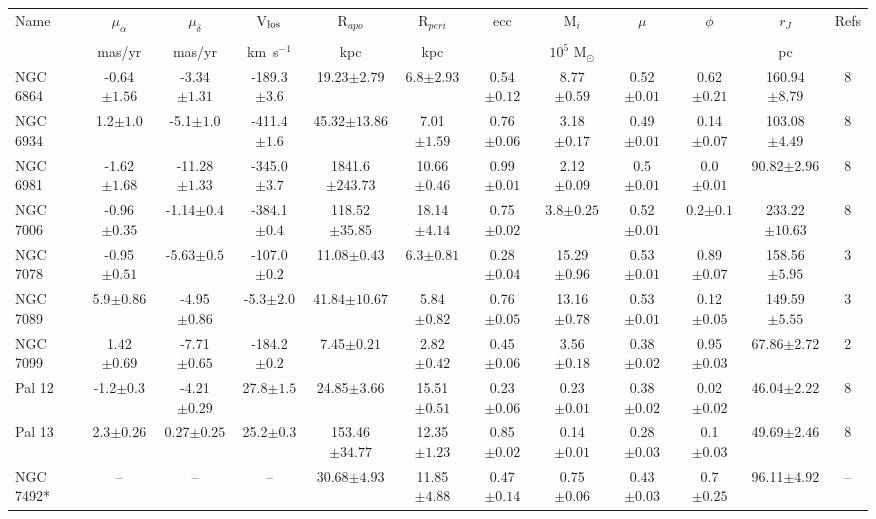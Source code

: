 \begin{landscape}
\begin{table}
\footnotesize
\begin{tabular}{lccccccccccc}
\hline
Name & $\mu_{\alpha}$ & $\mu_{\delta}$ & V$_{\rm los}$ & R$_{apo}$ & R$_{peri}$ & ecc & M$_{i}$ & $\mu$ & $\phi$ & $r_J$ & Refs \\\\
 & mas/yr & mas/yr & km$\,$ s$^{-1}$ & kpc & kpc & & $10^5$ M$_{\odot}$ & & & pc & \\
\hline
\hline
NGC 6864 & -0.64$\pm{1.56}$ & -3.34$\pm{1.31}$ & -189.3$\pm{3.6}$ & 19.23$\pm{2.79}$ & 6.8$\pm{2.93}$ & 0.54$\pm{0.12}$ & 8.77$\pm{0.59}$ & 0.52$\pm{0.01}$ & 0.62$\pm{0.21}$ & 160.94$\pm{8.79}$&8 \\ 
NGC 6934 & 1.2$\pm{1.0}$ & -5.1$\pm{1.0}$ & -411.4$\pm{1.6}$ & 45.32$\pm{13.86}$ & 7.01$\pm{1.59}$ & 0.76$\pm{0.06}$ & 3.18$\pm{0.17}$ & 0.49$\pm{0.01}$ & 0.14$\pm{0.07}$ & 103.08$\pm{4.49}$&8 \\ 
NGC 6981 & -1.62$\pm{1.68}$ & -11.28$\pm{1.33}$ & -345.0$\pm{3.7}$ & 1841.6$\pm{243.73}$ & 10.66$\pm{0.46}$ & 0.99$\pm{0.01}$ & 2.12$\pm{0.09}$ & 0.5$\pm{0.01}$ & 0.0$\pm{0.01}$ & 90.82$\pm{2.96}$&8 \\ 
NGC 7006 & -0.96$\pm{0.35}$ & -1.14$\pm{0.4}$ & -384.1$\pm{0.4}$ & 118.52$\pm{35.85}$ & 18.14$\pm{4.14}$ & 0.75$\pm{0.02}$ & 3.8$\pm{0.25}$ & 0.52$\pm{0.01}$ & 0.2$\pm{0.1}$ & 233.22$\pm{10.63}$&8 \\ 
NGC 7078 & -0.95$\pm{0.51}$ & -5.63$\pm{0.5}$ & -107.0$\pm{0.2}$ & 11.08$\pm{0.43}$ & 6.3$\pm{0.81}$ & 0.28$\pm{0.04}$ & 15.29$\pm{0.96}$ & 0.53$\pm{0.01}$ & 0.89$\pm{0.07}$ & 158.56$\pm{5.95}$&3 \\ 
NGC 7089 & 5.9$\pm{0.86}$ & -4.95$\pm{0.86}$ & -5.3$\pm{2.0}$ & 41.84$\pm{10.67}$ & 5.84$\pm{0.82}$ & 0.76$\pm{0.05}$ & 13.16$\pm{0.78}$ & 0.53$\pm{0.01}$ & 0.12$\pm{0.05}$ & 149.59$\pm{5.55}$&3 \\ 
NGC 7099 & 1.42$\pm{0.69}$ & -7.71$\pm{0.65}$ & -184.2$\pm{0.2}$ & 7.45$\pm{0.21}$ & 2.82$\pm{0.42}$ & 0.45$\pm{0.06}$ & 3.56$\pm{0.18}$ & 0.38$\pm{0.02}$ & 0.95$\pm{0.03}$ & 67.86$\pm{2.72}$&2 \\ 
Pal 12 & -1.2$\pm{0.3}$ & -4.21$\pm{0.29}$ & 27.8$\pm{1.5}$ & 24.85$\pm{3.66}$ & 15.51$\pm{0.51}$ & 0.23$\pm{0.06}$ & 0.23$\pm{0.01}$ & 0.38$\pm{0.02}$ & 0.02$\pm{0.02}$ & 46.04$\pm{2.22}$&8 \\ 
Pal 13 & 2.3$\pm{0.26}$ & 0.27$\pm{0.25}$ & 25.2$\pm{0.3}$ & 153.46$\pm{34.77}$ & 12.35$\pm{1.23}$ & 0.85$\pm{0.02}$ & 0.14$\pm{0.01}$ & 0.28$\pm{0.03}$ & 0.1$\pm{0.03}$ & 49.69$\pm{2.46}$&8 \\ 
NGC 7492* & -- & -- & -- & 30.68$\pm{4.93}$ & 11.85$\pm{4.88}$ & 0.47$\pm{0.14}$ & 0.75$\pm{0.06}$ & 0.43$\pm{0.03}$ & 0.7$\pm{0.25}$ & 96.11$\pm{4.92}$&-- \\ 

\hline
\end{tabular}
\contcaption{}
\label{summary}
\end{table}
\end{landscape}


